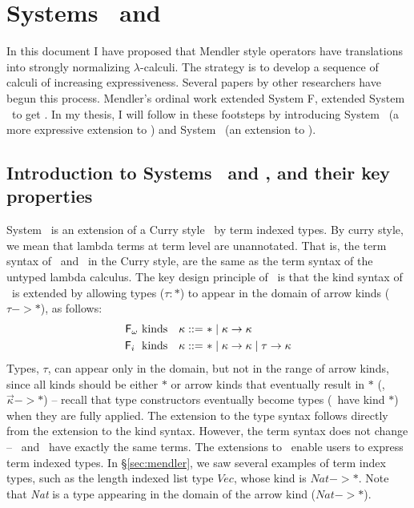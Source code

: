 \section{Systems \Fi\ and \Fixi}\label{sec:Fi}

In this document I have proposed that Mendler style operators have translations
into strongly normalizing $\lambda$-calculi. The strategy is to develop
a sequence of calculi of increasing expressiveness. Several papers by other
researchers have begun this process. Mendler's ordinal work \cite{Mendler87}
extended System \textsf{F}, \citet{AbeMat04} extended System \Fw\ to get \Fixw.
In my thesis, I will follow in these footsteps by introducing System \Fi\
(a more expressive extension to \Fw) and System \Fixi\ (an extension to \Fixw).


\subsection{Introduction to Systems \Fi\ and \Fixi, and their key properties}
System \Fi\ is an extension of a Curry style \Fw\ by term indexed types.
By curry style, we mean that lambda terms at term level are unannotated.
That is, the term syntax of \Fi\ and \Fw\, in the Curry style, are
the same as the term syntax of the untyped lambda calculus.
The key design principle of \Fi\ is that the kind syntax of \Fw\ is extended
by allowing types ($\tau : *$) to appear in the domain of arrow kinds
($\tau -> *$), as follows:
\begin{align*}
\text{\ensuremath{\mathsf{F}_\omega}\ kinds} ~~~ \kappa ::= ~ & * \mid \kappa -> \kappa \\
\text{\ensuremath{\mathsf{F}_i}\; kinds}~~~ \kappa ::= ~ & * \mid \kappa -> \kappa \mid \tau -> \kappa
\end{align*}
Types, $\tau$, can appear only in the domain, but not in the range of
arrow kinds, since all kinds should be either $*$ or arrow kinds
that eventually result in $*$ (\ie, $\vec{\kappa} -> *$) -- recall that
type constructors eventually become types (\ie\ have kind $*$) when they are fully applied.
The extension to the type syntax follows directly from the extension to the kind syntax.
However, the term syntax does not change -- \Fi\ and \Fw\ have exactly the
same terms.
The extensions to \Fi\ enable users to express term indexed types.
In \S\ref{sec:mendler}, we saw several examples of term index types, such as
the length indexed list type $\textit{Vec}$, whose kind is $\textit{Nat} -> *$.
Note that \textit{Nat} is a type appearing in the domain of the arrow kind
($\textit{Nat} -> *$).

